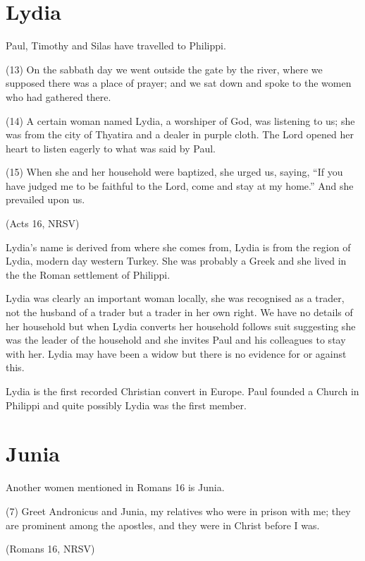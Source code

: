 \documentclass[a5paper, openany, oneside, pagesize,
headings=standardclasses, chapterprefix=false]{scrbook}
\begin{document}
\section{Lydia}

Paul, Timothy and Silas have travelled to Philippi.

\begin{myquote}
(13) On the sabbath day we went outside the gate by the river, where
we supposed there was a place of prayer; and we sat down and spoke to
the women who had gathered there.

(14) A certain woman named Lydia, a worshiper of God, was listening to
us; she was from the city of Thyatira and a dealer in purple cloth.
The Lord opened her heart to listen eagerly to what was said by Paul.

(15) When she and her household were baptized, she urged us, saying, ``If you have judged me to be faithful to the Lord, come and stay at my home.'' And she prevailed upon us.

(Acts 16, NRSV)
\end{myquote}

Lydia's name is derived from where she comes from, Lydia is from the
region of Lydia, modern day western Turkey. She was probably a Greek
and she lived in the the Roman settlement of
Philippi. 

Lydia was clearly an important woman locally, she was recognised as a
trader, not the husband of a trader but a trader in her own right. We
have no details of her household but when Lydia converts her household
follows suit suggesting she was the leader of the household and she
invites Paul and his colleagues to stay with her. Lydia may have been
a widow but there is no evidence for or against this.

Lydia is the first recorded Christian convert in Europe. Paul founded
a Church in Philippi and quite possibly Lydia was the first member.

\section{Junia}

Another women mentioned in Romans 16 is Junia.

\begin{myquote}
(7) Greet Andronicus and Junia, my relatives who were in prison with
me; they are prominent among the apostles, and they were in Christ
before I was.

(Romans 16, NRSV)
\end{myquote}
\end{document}
